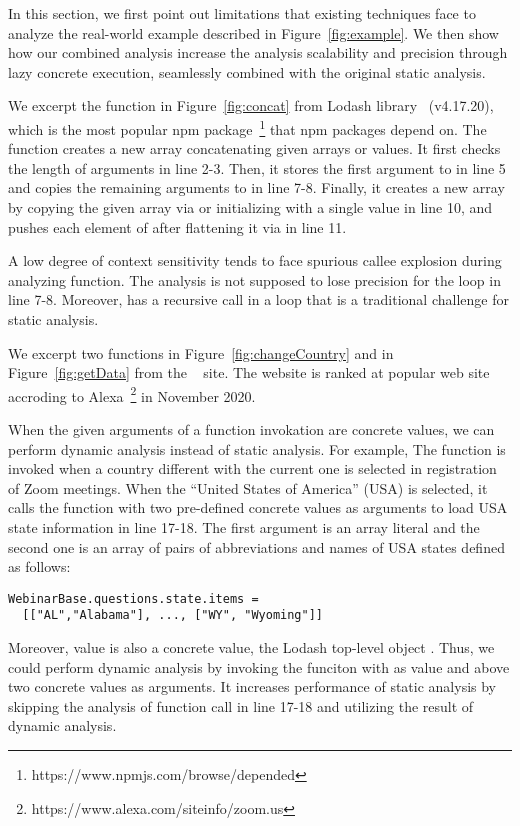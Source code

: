 In this section, we first point out limitations that existing techniques face to
analyze the real-world example described in Figure~\ref{fig:example}.
We then show how our combined analysis increase the analysis scalability and
precision through lazy concrete execution, seamlessly combined with the original
static analysis.


We excerpt the  function in Figure~\ref{fig:concat} from Lodash
library~\cite{lodash} (v4.17.20), which is the most popular npm package~\footnote{https://www.npmjs.com/browse/depended}
that  npm packages depend on.
The  function creates a new array concatenating given arrays or
values.
It first checks the length of arguments in line 2-3. Then, it stores the first
argument to  in line 5 and copies the remaining arguments to
 in line 7-8.
Finally, it creates a new array by copying the given array via 
or initializing with a single value in line 10, and pushes each element of
 after flattening it via  in line 11.


A low degree of context sensitivity tends to face spurious callee explosion
during analyzing  function.
The analysis is not supposed to lose precision for the loop in line 7-8.
Moreover,  has a recursive call in a loop that is a
traditional challenge for static analysis.


We excerpt two functions  in Figure~\ref{fig:changeCountry}
and  in Figure~\ref{fig:getData} from the ~\cite{zoom}
site.
The website  is ranked at  popular web site accroding
to Alexa~\footnote{https://www.alexa.com/siteinfo/zoom.us} in November 2020.


When the given arguments of a function invokation are concrete values, we can
perform dynamic analysis instead of static analysis. For example, The
 function is invoked when a country different with the
current one is selected in registration of Zoom meetings.  When the ``United
States of America'' (USA) is selected, it calls the  function
with two pre-defined concrete values as arguments to load USA state information
in line 17-18.  The first argument is an array literal  and the second one is an array of pairs of abbreviations and names of
USA states defined as follows:
\begin{lstlisting}[style=myJSstyle,numbers=none]
WebinarBase.questions.state.items =
  [["AL","Alabama"], ..., ["WY", "Wyoming"]]
\end{lstlisting}
Moreover,  value is also a concrete value, the Lodash top-level
object \jscode{\_}.  Thus, we could perform dynamic analysis by invoking the
 funciton with \jscode{\_} as  value and above two
concrete values as arguments.  It increases performance of static analysis by
skipping the analysis of function call in line 17-18 and utilizing the result of
dynamic analysis.

